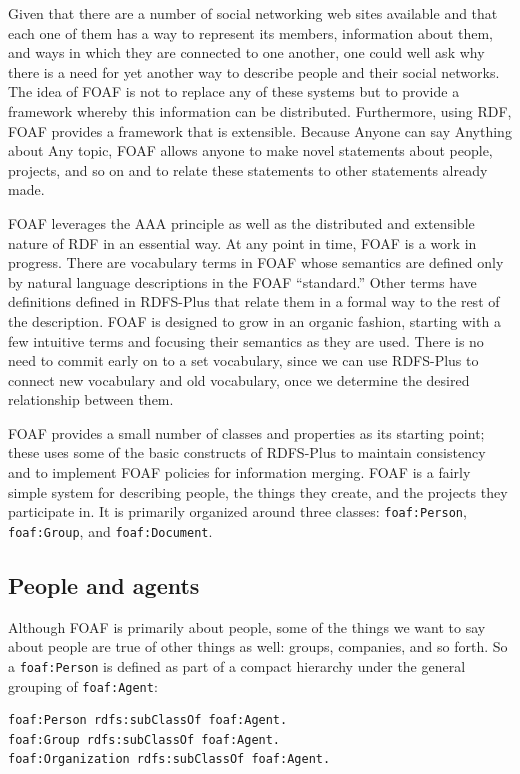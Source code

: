 Given that there are a number of social networking web sites available
and that each one of them has a way to represent its members,
information about them, and ways in which they are connected to one
another, one could well ask why there is a need for yet another way to
describe people and their social networks. The idea of FOAF is not to
replace any of these systems but to provide a framework whereby this
information can be distributed. Furthermore, using RDF, FOAF provides a
framework that is extensible. Because Anyone can say Anything about Any
topic, FOAF allows anyone to make novel statements about people,
projects, and so on and to relate these statements to other statements
already made.

FOAF leverages the AAA principle as well as the distributed and
extensible nature of RDF in an essential way. At any point in time, FOAF
is a work in progress. There are vocabulary terms in FOAF whose
semantics are defined only by natural language descriptions in the FOAF
``standard.'' Other terms have definitions defined in RDFS-Plus that
relate them in a formal way to the rest of the description. FOAF is
designed to grow in an organic fashion, starting with a few intuitive
terms and focusing their semantics as they are used. There is no need to
commit early on to a set vocabulary, since we can use RDFS-Plus to
connect new vocabulary and old vocabulary, once we determine the desired
relationship between them.

FOAF provides a small number of classes and properties as its starting
point; these uses some of the basic constructs of RDFS-Plus to maintain
consistency and to implement FOAF policies for information merging. FOAF
is a fairly simple system for describing people, the things they create,
and the projects they participate in. It is primarily organized around
three classes: \texttt{foaf:Person}, \texttt{foaf:Group}, and \texttt{foaf:Document}.

\subsection{People and agents}

Although FOAF is primarily about people, some of the things we want to
say about people are true of other things as well: groups, companies,
and so forth. So a \texttt{foaf:Person} is defined as part of a compact hierarchy
under the general grouping of \texttt{foaf:Agent}:

\begin{lstlisting}
foaf:Person rdfs:subClassOf foaf:Agent.
foaf:Group rdfs:subClassOf foaf:Agent.
foaf:Organization rdfs:subClassOf foaf:Agent.
\end{lstlisting}

